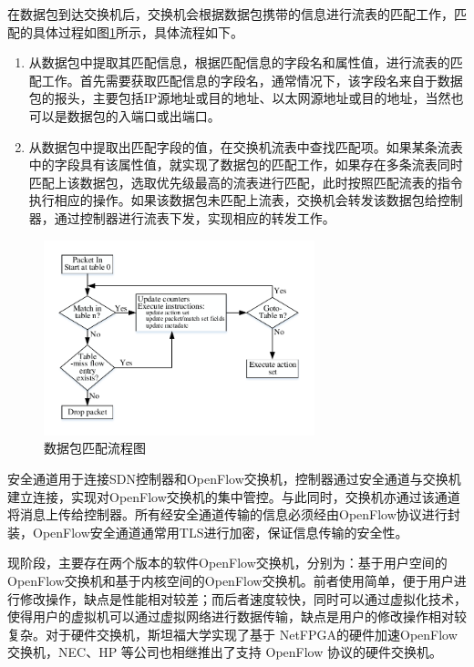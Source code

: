 在数据包到达交换机后，交换机会根据数据包携带的信息进行流表的匹配工作，匹配的具体过程如图\ref{fig:match}所示，具体流程如下。

\begin{enumerate}
\item 从数据包中提取其匹配信息，根据匹配信息的字段名和属性值，进行流表的匹配工作。首先需要获取匹配信息的字段名，通常情况下，该字段名来自于数据包的报头，主要包括IP源地址或目的地址、以太网源地址或目的地址，当然也可以是数据包的入端口或出端口。 
\item 从数据包中提取出匹配字段的值，在交换机流表中查找匹配项。如果某条流表中的字段具有该属性值，就实现了数据包的匹配工作，如果存在多条流表同时匹配上该数据包，选取优先级最高的流表进行匹配，此时按照匹配流表的指令执行相应的操作。如果该数据包未匹配上流表，交换机会转发该数据包给控制器，通过控制器进行流表下发，实现相应的转发工作\cite{openflow-7}。
\end{enumerate}

\begin{figure}[!htb]
  \centering
  \includegraphics[width=0.7\textwidth]{logo/match}
  \caption{数据包匹配流程图}
  \label{fig:match}
\end{figure}

安全通道用于连接SDN控制器和OpenFlow交换机，控制器通过安全通道与交换机建立连接，实现对OpenFlow交换机的集中管控。与此同时，交换机亦通过该通道将消息上传给控制器。所有经安全通道传输的信息必须经由OpenFlow协议进行封装，OpenFlow安全通道通常用TLS进行加密，保证信息传输的安全性。

现阶段，主要存在两个版本的软件OpenFlow交换机\cite{openflow-2}，分别为：基于用户空间的OpenFlow交换机和基于内核空间的OpenFlow交换机。前者使用简单，便于用户进行修改操作，缺点是性能相对较差；而后者速度较快，同时可以通过虚拟化技术，使得用户的虚拟机可以通过虚拟网络进行数据传输，缺点是用户的修改操作相对较复杂\cite{openflow-3}。对于硬件交换机，斯坦福大学实现了基于 NetFPGA的硬件加速OpenFlow交换机\cite{openflow-4}，NEC、HP 等公司也相继推出了支持 OpenFlow 协议的硬件交换机\cite{openflow-1}。

